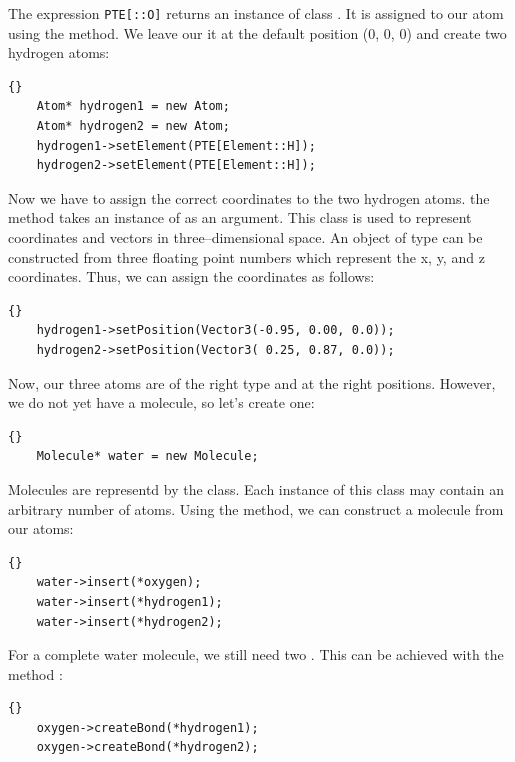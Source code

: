 \noindent
The expression {\tt PTE[::O]} returns an instance of class
. It is assigned to our atom using the 
method. We leave our it at the default position (0, 0, 0) and create two hydrogen atoms:

\begin{lstlisting}{}
	Atom* hydrogen1 = new Atom;
	Atom* hydrogen2 = new Atom;
	hydrogen1->setElement(PTE[Element::H]);
	hydrogen2->setElement(PTE[Element::H]);
\end{lstlisting}
	
\noindent
Now we have to assign the correct coordinates to the two hydrogen atoms.  the
method  takes an instance of  as an
argument. This class is used to represent coordinates and vectors in
three--dimensional space. An object of type  can be constructed
from three floating point numbers which represent the x, y, and z coordinates.
Thus, we can assign the coordinates as follows:
 
\begin{lstlisting}{}
 	hydrogen1->setPosition(Vector3(-0.95, 0.00, 0.0));
 	hydrogen2->setPosition(Vector3( 0.25, 0.87, 0.0));
\end{lstlisting}

\noindent

Now, our three atoms are of the right type and at the right positions. However, we
do not yet have a molecule, so let's create one:\\

\begin{lstlisting}{}
	Molecule* water = new Molecule;
\end{lstlisting}

\noindent
Molecules are representd by the  class. Each instance of this
class may contain an arbitrary number of atoms. Using the 
method, we can construct a molecule from our atoms:

\begin{lstlisting}{}
	water->insert(*oxygen);
	water->insert(*hydrogen1);
	water->insert(*hydrogen2);
\end{lstlisting}

\noindent
For a complete water molecule, we still need two . This can be
achieved with the method :
	
\begin{lstlisting}{}
	oxygen->createBond(*hydrogen1);
	oxygen->createBond(*hydrogen2);
\end{lstlisting}

